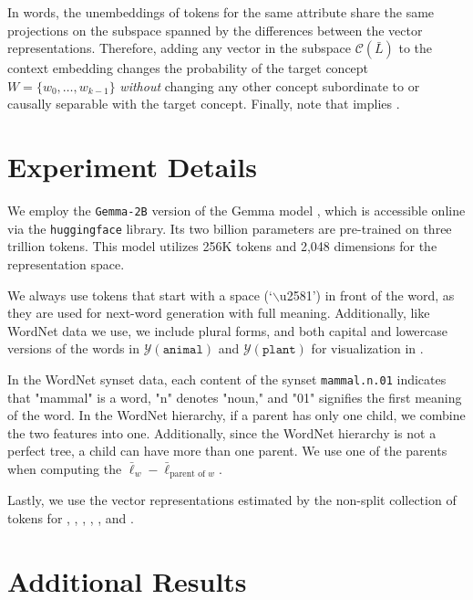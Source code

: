 \documentclass{article}
\newcommand{\ConceptValue}[1]{\texttt{#1}}
\newcommand{\yquad}{\mathcal{Y}}
\begin{document}
In words, the unembeddings of tokens for the same attribute share the same projections on the subspace spanned by the differences between the vector representations.
Therefore, adding any vector in the subspace $\mathcal{C}(\bar{L})$ to the context embedding changes the probability of the target concept $W=\{w_0, \dots, w_{k-1}\}$ \emph{without} changing any other concept subordinate to or causally separable with the target concept.
Finally, note that  implies .


\section{Experiment Details}\label{sec:experiment_details}
We employ the \texttt{Gemma-2B} version of the Gemma model , which is accessible online via the \texttt{huggingface} library.
Its two billion parameters are pre-trained on three trillion tokens.
This model utilizes 256K tokens and 2,048 dimensions for the representation space.

We always use tokens that start with a space (`$\backslash$u2581') in front of the word, as they are used for next-word generation with full meaning.
Additionally, like WordNet data we use, we include plural forms, and both capital and lowercase versions of the words in $\yquad(\ConceptValue{animal})$ and $\yquad(\ConceptValue{plant})$ for visualization in .

In the WordNet synset data, each content of the synset \texttt{mammal.n.01} indicates that "mammal" is a word, "n" denotes "noun," and "01" signifies the first meaning of the word.
In the WordNet hierarchy, if a parent has only one child, we combine the two features into one.
Additionally, since the WordNet hierarchy is not a perfect tree, a child can have more than one parent.
We use one of the parents when computing the $\bar\ell_{w} - \bar\ell_{\text{parent of }w}$.

Lastly, we use the vector representations estimated by the non-split collection of tokens for , ,  , , , and . 


\section{Additional Results}\label{sec:additional_results}
\end{document}
